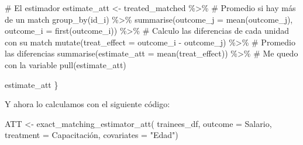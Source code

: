 \documentclass[
  letterpaper,
  DIV=11,
  numbers=noendperiod,
  oneside]{scrreprt}
\newenvironment{Shaded}{\begin{snugshade}}{\end{snugshade}}
\newcommand{\AttributeTok}[1]{\textcolor[rgb]{0.40,0.45,0.13}{#1}}
\newcommand{\CommentTok}[1]{\textcolor[rgb]{0.37,0.37,0.37}{#1}}
\newcommand{\DecValTok}[1]{\textcolor[rgb]{0.68,0.00,0.00}{#1}}
\newcommand{\FunctionTok}[1]{\textcolor[rgb]{0.28,0.35,0.67}{#1}}
\newcommand{\NormalTok}[1]{\textcolor[rgb]{0.00,0.23,0.31}{#1}}
\newcommand{\OtherTok}[1]{\textcolor[rgb]{0.00,0.23,0.31}{#1}}
\newcommand{\SpecialCharTok}[1]{\textcolor[rgb]{0.37,0.37,0.37}{#1}}
\newcommand{\StringTok}[1]{\textcolor[rgb]{0.13,0.47,0.30}{#1}}
\begin{document}
\begin{Shaded}
\begin{Highlighting}[]
  \CommentTok{\# El estimador}
\NormalTok{  estimate\_att }\OtherTok{\textless{}{-}} 
\NormalTok{    treated\_matched }\SpecialCharTok{\%\textgreater{}\%} 
    \CommentTok{\# Promedio si hay más de un match}
    \FunctionTok{group\_by}\NormalTok{(id\_i) }\SpecialCharTok{\%\textgreater{}\%}
    \FunctionTok{summarise}\NormalTok{(}\AttributeTok{outcome\_j =} \FunctionTok{mean}\NormalTok{(outcome\_j),}
              \AttributeTok{outcome\_i =} \FunctionTok{first}\NormalTok{(outcome\_i)) }\SpecialCharTok{\%\textgreater{}\%}
    \CommentTok{\# Calculo las diferencias de cada unidad con su match}
    \FunctionTok{mutate}\NormalTok{(}\AttributeTok{treat\_effect =}\NormalTok{ outcome\_i }\SpecialCharTok{{-}}\NormalTok{ outcome\_j) }\SpecialCharTok{\%\textgreater{}\%} 
    \CommentTok{\# Promedio las diferencias}
    \FunctionTok{summarise}\NormalTok{(}\AttributeTok{estimate\_att =} \FunctionTok{mean}\NormalTok{(treat\_effect)) }\SpecialCharTok{\%\textgreater{}\%} 
    \CommentTok{\# Me quedo con la variable}
    \FunctionTok{pull}\NormalTok{(estimate\_att)}
  
\NormalTok{  estimate\_att}
\NormalTok{\}}
\end{Highlighting}
\end{Shaded}

Y ahora lo calculamos con el siguiente código:

\begin{Shaded}
\begin{Highlighting}[]
\NormalTok{ATT }\OtherTok{\textless{}{-}} 
  \FunctionTok{exact\_matching\_estimator\_att}\NormalTok{(}
\NormalTok{    trainees\_df,}
    \AttributeTok{outcome =}\NormalTok{ Salario,}
    \AttributeTok{treatment =}\NormalTok{ Capacitación,}
    \AttributeTok{covariates =} \StringTok{"Edad"}\NormalTok{)}
\end{Highlighting}
\end{Shaded}

\begin{Shaded}
\end{Shaded}
\end{document}

